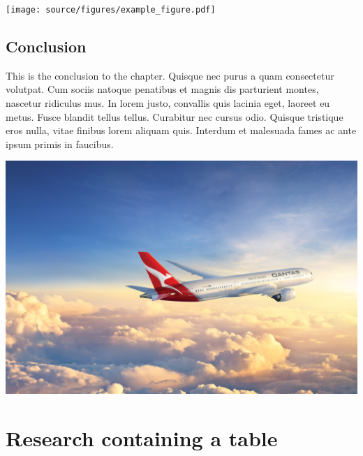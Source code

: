 \documentclass[12pt,a4paper,]{report}
\let\origfigure=\figure
\let\endorigfigure=\endfigure
\renewenvironment{figure}[1][]{%
\origfigure[b]
}{%
\endorigfigure
}
\begin{document}
\begin{figure}[htbp]
\centering
\texttt{[image: source/figures/example\_figure.pdf]}
\caption[It's a boat]{RV Calypso is a former British Royal Navy minesweeper converted into a research vessel for the oceanographic researcher Jacques-Yves Cousteau. It was equipped with a mobile laboratory for underwater field research.}\label{fig:my_fig}
\end{figure}

\hypertarget{conclusion-2}{%
\section{Conclusion}\label{conclusion-2}}

This is the conclusion to the chapter. Quisque nec purus a quam
consectetur volutpat. Cum sociis natoque penatibus et magnis dis
parturient montes, nascetur ridiculus mus. In lorem justo, convallis
quis lacinia eget, laoreet eu metus. Fusce blandit tellus tellus.
Curabitur nec cursus odio. Quisque tristique eros nulla, vitae finibus
lorem aliquam quis. Interdum et malesuada fames ac ante ipsum primis in
faucibus.

\begin{figure}
\hypertarget{fig:other_fig}{%
\centering
\includegraphics[width=1\textwidth,height=\textheight]{source/figures/full_caption_example.jpg}
\caption{This is not a boat}\label{fig:other_fig}
}
\end{figure}

\hypertarget{research-containing-a-table}{%
\chapter{Research containing a
table}\label{research-containing-a-table}}
\end{document}
